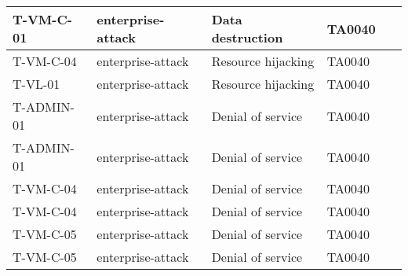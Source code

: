 \begin{table}[!ht]
\begin{longtable}{|l|l|l|l|l|}
        T-VM-C-01 & enterprise-attack & Data destruction & TA0040 & ~ \\ \hline
        T-VM-C-04 & enterprise-attack & Resource hijacking & TA0040 & ~ \\ \hline
        T-VL-01 & enterprise-attack & Resource hijacking & TA0040 & ~ \\ \hline
        T-ADMIN-01 & enterprise-attack & Denial of service & TA0040 & ~ \\ \hline
        T-ADMIN-01 & enterprise-attack & Denial of service & TA0040 & ~ \\ \hline
        T-VM-C-04 & enterprise-attack & Denial of service & TA0040 & ~ \\ \hline
        T-VM-C-04 & enterprise-attack & Denial of service & TA0040 & ~ \\ \hline
        T-VM-C-05 & enterprise-attack & Denial of service & TA0040 & ~ \\ \hline
        T-VM-C-05 & enterprise-attack & Denial of service & TA0040 & ~ \\ \hline
    \end{longtable}
\end{table}


